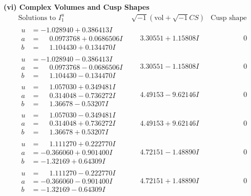 \documentclass[1p]{elsarticle_modified}
\theoremstyle{definition}
\newcommand{\I}{\sqrt{-1}}
\begin{document}
\newpage\flushleft \textbf{(vi) Complex Volumes and Cusp Shapes}
$$\begin{array}{c|c|c}  
\text{Solutions to }I^u_{1}& \I (\text{vol} + \sqrt{-1}CS) & \text{Cusp shape}\\
 \hline 
\begin{aligned}
u &= -1.028940 + 0.386413 I \\
a &= \phantom{-}0.0973768 + 0.0686506 I \\
b &= \phantom{-}1.104430 + 0.134470 I\end{aligned}
 & \phantom{-}3.30551 + 1.15808 I & \phantom{-0.000000 } 0 \\ \hline\begin{aligned}
u &= -1.028940 - 0.386413 I \\
a &= \phantom{-}0.0973768 - 0.0686506 I \\
b &= \phantom{-}1.104430 - 0.134470 I\end{aligned}
 & \phantom{-}3.30551 - 1.15808 I & \phantom{-0.000000 } 0 \\ \hline\begin{aligned}
u &= \phantom{-}1.057030 + 0.349481 I \\
a &= \phantom{-}0.314048 - 0.736272 I \\
b &= \phantom{-}1.36678 - 0.53207 I\end{aligned}
 & \phantom{-}4.49153 - 9.62146 I & \phantom{-0.000000 } 0 \\ \hline\begin{aligned}
u &= \phantom{-}1.057030 - 0.349481 I \\
a &= \phantom{-}0.314048 + 0.736272 I \\
b &= \phantom{-}1.36678 + 0.53207 I\end{aligned}
 & \phantom{-}4.49153 + 9.62146 I & \phantom{-0.000000 } 0 \\ \hline\begin{aligned}
u &= \phantom{-}1.111270 + 0.222770 I \\
a &= -0.366060 + 0.901400 I \\
b &= -1.32169 + 0.64309 I\end{aligned}
 & \phantom{-}4.72151 - 1.48890 I & \phantom{-0.000000 } 0 \\ \hline\begin{aligned}
u &= \phantom{-}1.111270 - 0.222770 I \\
a &= -0.366060 - 0.901400 I \\
b &= -1.32169 - 0.64309 I\end{aligned}
 & \phantom{-}4.72151 + 1.48890 I & \phantom{-0.000000 } 0 \\ \hline\begin{aligned}

\end{aligned}
\end{array}$$
\end{document}

